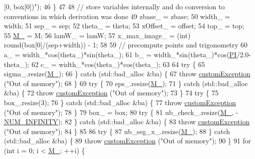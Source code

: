 \begin{DoxyCode}
{       [0, box[0])"});
46     \}
47 
48     \textcolor{comment}{// store variables internally and do conversion to conventions in which derivation was done}
49     zbase\_ = zbase;
50     width\_ = width;
51     sep\_ = sep;
52     theta\_ = theta;
53     xOffset\_ = offset;
54     top\_ = top;
55     \hyperlink{classbarrier_a274cf283ffc97c22ffa9a4258369c400}{M\_} = M;
56     lamW\_ = lamW;
57     x\_max\_image\_ = (int) round(box[0]/(sep+width)) - 1;
58 
59     \textcolor{comment}{// precompute points and trigonometry}
60     a\_ = width\_*cos(theta\_)*sin(theta\_);
61     b\_ = width\_*sin(theta\_)*cos(\hyperlink{global_8h_a598a3330b3c21701223ee0ca14316eca}{PI}/2.0-theta\_);
62     c\_ = width\_*cos(theta\_)*cos(theta\_);
63 
64     \textcolor{keywordflow}{try} \{
65         sigma\_.resize(\hyperlink{classbarrier_a274cf283ffc97c22ffa9a4258369c400}{M\_});
66     \} \textcolor{keywordflow}{catch} (std::bad\_alloc &ba) \{
67         \textcolor{keywordflow}{throw} \hyperlink{classcustom_exception}{customException} (\textcolor{stringliteral}{"Out of memory"});
68     \}
69     \textcolor{keywordflow}{try} \{
70         eps\_.resize(\hyperlink{classbarrier_a274cf283ffc97c22ffa9a4258369c400}{M\_});
71     \} \textcolor{keywordflow}{catch} (std::bad\_alloc &ba) \{
72         \textcolor{keywordflow}{throw} \hyperlink{classcustom_exception}{customException} (\textcolor{stringliteral}{"Out of memory"});
73     \}
74     \textcolor{keywordflow}{try} \{
75         box\_.resize(3);
76     \} \textcolor{keywordflow}{catch} (std::bad\_alloc &ba) \{
77         \textcolor{keywordflow}{throw} \hyperlink{classcustom_exception}{customException} (\textcolor{stringliteral}{"Out of memory"});
78     \}
79     box\_ = box;
80     \textcolor{keywordflow}{try} \{
81         ub\_check\_.resize(\hyperlink{classbarrier_a274cf283ffc97c22ffa9a4258369c400}{M\_}, -\hyperlink{potentials_8h_ab94ab1d09e2291d03fe92a0e24a9d33b}{NUM\_INFINITY});
82     \} \textcolor{keywordflow}{catch} (std::bad\_alloc &ba) \{
83         \textcolor{keywordflow}{throw} \hyperlink{classcustom_exception}{customException} (\textcolor{stringliteral}{"Out of memory"});
84     \}
85 
86     \textcolor{keywordflow}{try} \{
87         ub\_seg\_x\_.resize(\hyperlink{classbarrier_a274cf283ffc97c22ffa9a4258369c400}{M\_});
88     \} \textcolor{keywordflow}{catch} (std::bad\_alloc &ba) \{
89         \textcolor{keywordflow}{throw} \hyperlink{classcustom_exception}{customException} (\textcolor{stringliteral}{"Out of memory"});
90     \}
91     \textcolor{keywordflow}{for} (\textcolor{keywordtype}{int} i = 0; i < \hyperlink{classbarrier_a274cf283ffc97c22ffa9a4258369c400}{M\_}; ++i) \{

\end{DoxyCode}

